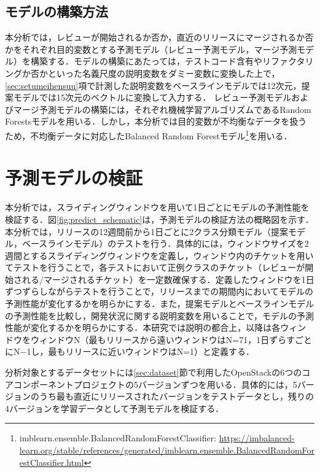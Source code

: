 \documentclass[submit]{ipsj}
\begin{document}
\subsection{モデルの構築方法}
本分析では，レビューが開始されるか否か，直近のリリースにマージされるか否かをそれぞれ目的変数とする予測モデル（レビュー予測モデル，マージ予測モデル）を構築する．モデルの構築にあたっては，テストコード含有やリファクタリングか否かといった名義尺度の説明変数をダミー変数に変換した上で，\ref{sec:setumeihensuu}項で計測した説明変数をベースラインモデルでは12次元，提案モデルでは15次元のベクトルに変換して入力する．
レビュー予測モデルおよびマージ予測モデルの構築には，それぞれ機械学習アルゴリズムであるRandom Forestsモデル\cite{randomforest}を用いる．しかし，本分析では目的変数が不均衡なデータを扱うため，不均衡データに対応したBalanced Random Forestモデル\footnote{imblearn.ensemble.BalancedRandomForestClassifier: \url{https://imbalanced-learn.org/stable/references/generated/imblearn.ensemble.BalancedRandomForestClassifier.html}}を用いる．

\section{予測モデルの検証}\label{sec:kenshou}
本分析では，スライディングウィンドウを用いて1日ごとにモデルの予測性能を検証する．図\ref{fig:predict_schematic}は，予測モデルの検証方法の概略図を示す．本分析では，リリースの12週間前から1日ごとに2クラス分類モデル（提案モデル，ベースラインモデル）のテストを行う．具体的には，ウィンドウサイズを2週間とするスライディングウィンドウを定義し，ウィンドウ内のチケットを用いてテストを行うことで，各テストにおいて正例クラスのチケット（レビューが開始される/マージされるチケット）を一定数確保する．定義したウィンドウを1日ずつずらしながらテストを行うことで，リリースまでの期間内においてモデルの予測性能が変化するかを明らかにする．また，提案モデルとベースラインモデルの予測性能を比較し，開発状況に関する説明変数を用いることで，モデルの予測性能が変化するかを明らかにする．本研究では説明の都合上，以降は各ウィンドウをウィンドウN（最もリリースから遠いウィンドウはN=71，1日ずらすごとにN$-$1し，最もリリースに近いウィンドウはN=1）と定義する．

分析対象とするデータセットには\ref{sec:dataset}節で利用したOpenStackの6つのコアコンポーネントプロジェクトの5バージョンずつを用いる．具体的には，5バージョンのうち最も直近にリリースされたバージョンをテストデータとし，残りの4バージョンを学習データとして予測モデルを検証する．
\end{document}
